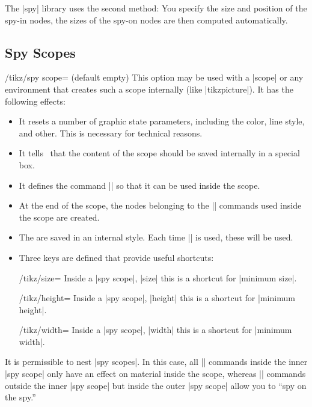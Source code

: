 The |spy| library uses the second method: You specify the size and
position of the spy-in nodes, the sizes of the spy-on nodes are then
computed automatically.



\subsection{Spy Scopes}

\begin{key}{/tikz/spy scope= (default \normalfont empty)}
  This option may be used with a |{scope}| or any environment that
  creates such a scope internally (like |{tikzpicture}|). It has the
  following effects:
  \begin{itemize}
  \item It resets a number of graphic state parameters, including the
    color, line style, and other. This is necessary for technical
    reasons.
  \item It tells \tikzname\ that the content of the scope should be saved
    internally in a special box.
  \item It defines the command |\spy| so that it can be used inside
    the scope.
  \item At the end of the scope, the nodes belonging to the |\spy|
    commands used inside the scope are created.
  \item The  are saved in an internal style. Each time
    |\spy| is used, these  will be used.
  \item Three keys are defined that provide useful shortcuts:
    \begin{key}{/tikz/size=}
      Inside a |spy scope|, |size| this is a shortcut for |minimum size|.
    \end{key}
    \begin{key}{/tikz/height=}
      Inside a |spy scope|, |height| this is a shortcut for |minimum height|.
    \end{key}
    \begin{key}{/tikz/width=}
      Inside a |spy scope|, |width| this is a shortcut for |minimum width|.
    \end{key}
  \end{itemize}
  It is permissible to nest |spy scopes|. In this case, all |\spy|
  commands inside the inner |spy scope| only have an effect on
  material inside the scope, whereas |\spy| commands outside the inner
  |spy scope| but inside the outer |spy scope| allow you to ``spy on
  the spy.''


\end{key}
